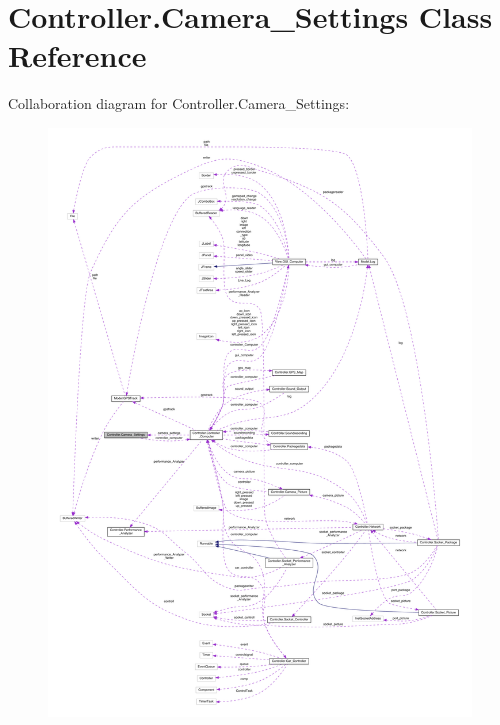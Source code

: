 \hypertarget{class_controller_1_1_camera___settings}{}\section{Controller.\+Camera\+\_\+\+Settings Class Reference}
\label{class_controller_1_1_camera___settings}


Collaboration diagram for Controller.\+Camera\+\_\+\+Settings\+:
\nopagebreak
\begin{figure}[H]
\begin{center}
\leavevmode
\includegraphics[width=350pt]{class_controller_1_1_camera___settings__coll__graph}
\end{center}
\end{figure}
